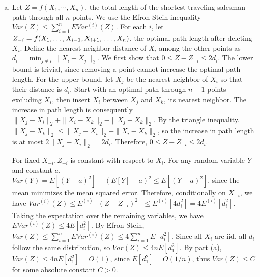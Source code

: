\documentclass[11pt,a4paper,margin=1in]{article}
\begin{document}
\begin{enumerate}[(a)]
    since for $n \geq 2$, $\frac{1}{n - 1} \leq \frac{2}{n}$ and exponential decay 
    is faster than $1/n$. Thus, there exists some absolute constant $C > 0$ such 
    that $E[D^2] \leq C/n$ for $n \geq 2$.
    \item Let $Z = f(X_1, \cdots, X_n)$, the total length of the shortest traveling
    salesman path through all $n$ points. We use the Efron-Stein inequality
    $Var(Z) \leq \sum_{i = 1}^{n}EVar^{(i)}(Z)$. For each $i$, let $Z_{-i} = f(X_1, \ldots, X_{i - 1}, X_{i + 1}, \\ \ldots, X_n)$, 
    the optimal path length after deleting $X_i$. Define the nearest neighbor distance
    of $X_i$ among the other points as $d_i = \min_{j \neq i}\|X_i - X_j\|_2$.
    We first show that $0 \leq Z - Z_{-i} \leq 2d_i$. The lower bound is trivial, 
    since removing a point cannot increase the optimal path length. For the upper
    bound, let $X_j$ be the nearest neighbor of $X_i$ so that their distance
    is $d_i$. Start with an optimal path through $n - 1$ points excluding $X_i$, 
    then insert $X_i$ between $X_j$ and $X_k$, its nearest neighbor. The increase
    in path length is consequently $\|X_j - X_i\|_2 + \|X_i - X_k\|_2 - \|X_j - X_k\|_2$.
    By the triangle inequality, $\|X_j - X_k\|_2 \leq \|X_j - X_i\|_2 + \|X_i - X_k\|_2$,
    so the increase in path length is at most $2\|X_j - X_i\|_2 = 2d_i$. Therefore, 
    $0 \leq Z - Z_{-i} \leq 2d_i$.

    For fixed $X_{-i}, Z_{-i}$ is constant with respect to $X_i$. For any 
    random variable $Y$ and constant $a$, $Var(Y) = E[(Y - a)^2] - (E[Y] - a)^2 \leq E[(Y - a)^2]$. 
    since the mean minimizes the mean squared error. Therefore, conditionally on
    $X_{-i}$, we have $Var^{(i)}(Z) \leq E^{(i)}[(Z - Z_{-i})^2] \leq E^{(i)}[4d_i^2] = 4E^{(i)}[d_i^2]$. 
    Taking the expectation over the remaining variables, we have $EVar^{(i)}(Z) \leq 4E[d_i^2]$. 
    By Efron-Stein, $Var(Z) \leq \sum_{i = 1}^{n}EVar^{(i)}(Z) \leq 4\sum_{i = 1}^{n}E[d_i^2]$.
    Since all $X_i$ are iid, all $d_i$ follow the same distribution, so $Var(Z) \leq 4nE[d_1^2]$. 
    By part (a), $Var(Z) \leq 4nE[d_1^2] = O(1)$, since $E[d_1^2] = O(1/n)$, thus
    $Var(Z) \leq C$ for some absolute constant $C > 0$.
\end{enumerate}
\end{document}
